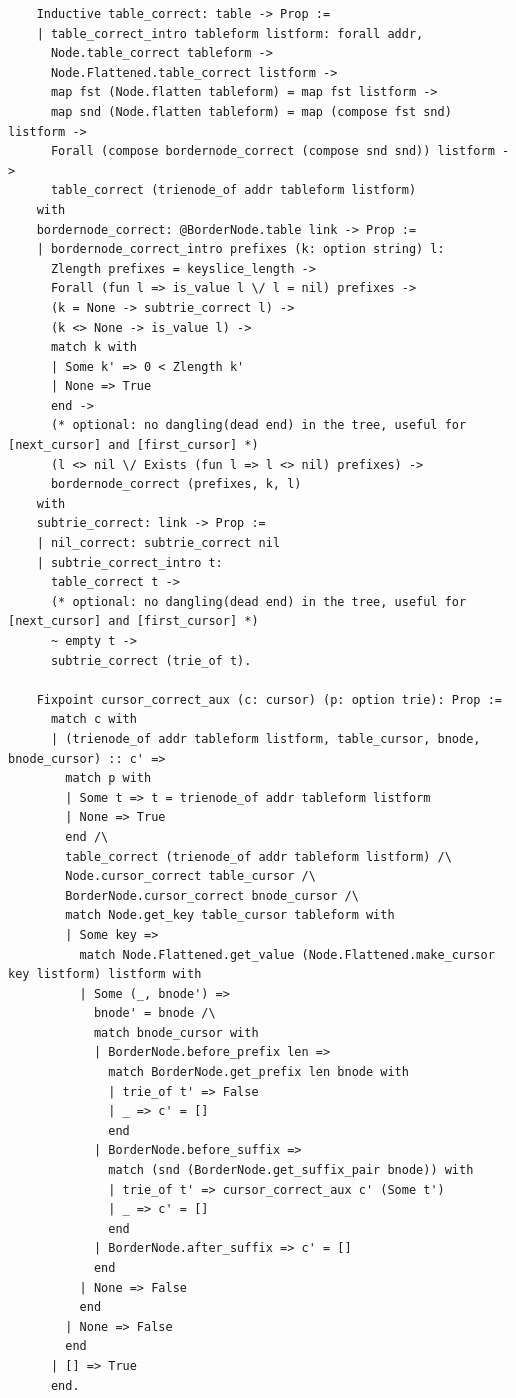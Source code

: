 \documentclass[runningheads]{llncs}
\begin{document}
\begin{verbatim}
    Inductive table_correct: table -> Prop :=
    | table_correct_intro tableform listform: forall addr,
      Node.table_correct tableform ->
      Node.Flattened.table_correct listform ->
      map fst (Node.flatten tableform) = map fst listform ->
      map snd (Node.flatten tableform) = map (compose fst snd) listform ->
      Forall (compose bordernode_correct (compose snd snd)) listform ->
      table_correct (trienode_of addr tableform listform)
    with
    bordernode_correct: @BorderNode.table link -> Prop :=
    | bordernode_correct_intro prefixes (k: option string) l:
      Zlength prefixes = keyslice_length ->
      Forall (fun l => is_value l \/ l = nil) prefixes ->
      (k = None -> subtrie_correct l) ->
      (k <> None -> is_value l) ->
      match k with
      | Some k' => 0 < Zlength k'
      | None => True
      end ->
      (* optional: no dangling(dead end) in the tree, useful for [next_cursor] and [first_cursor] *)
      (l <> nil \/ Exists (fun l => l <> nil) prefixes) ->
      bordernode_correct (prefixes, k, l)
    with
    subtrie_correct: link -> Prop :=
    | nil_correct: subtrie_correct nil
    | subtrie_correct_intro t:
      table_correct t ->
      (* optional: no dangling(dead end) in the tree, useful for [next_cursor] and [first_cursor] *)
      ~ empty t ->
      subtrie_correct (trie_of t).

    Fixpoint cursor_correct_aux (c: cursor) (p: option trie): Prop :=
      match c with
      | (trienode_of addr tableform listform, table_cursor, bnode, bnode_cursor) :: c' =>
        match p with
        | Some t => t = trienode_of addr tableform listform
        | None => True
        end /\
        table_correct (trienode_of addr tableform listform) /\
        Node.cursor_correct table_cursor /\
        BorderNode.cursor_correct bnode_cursor /\
        match Node.get_key table_cursor tableform with
        | Some key =>
          match Node.Flattened.get_value (Node.Flattened.make_cursor key listform) listform with
          | Some (_, bnode') =>
            bnode' = bnode /\
            match bnode_cursor with
            | BorderNode.before_prefix len =>
              match BorderNode.get_prefix len bnode with
              | trie_of t' => False
              | _ => c' = []
              end
            | BorderNode.before_suffix =>
              match (snd (BorderNode.get_suffix_pair bnode)) with
              | trie_of t' => cursor_correct_aux c' (Some t')
              | _ => c' = []
              end
            | BorderNode.after_suffix => c' = []
            end
          | None => False
          end
        | None => False
        end
      | [] => True
      end.


\end{verbatim}
\end{document}
